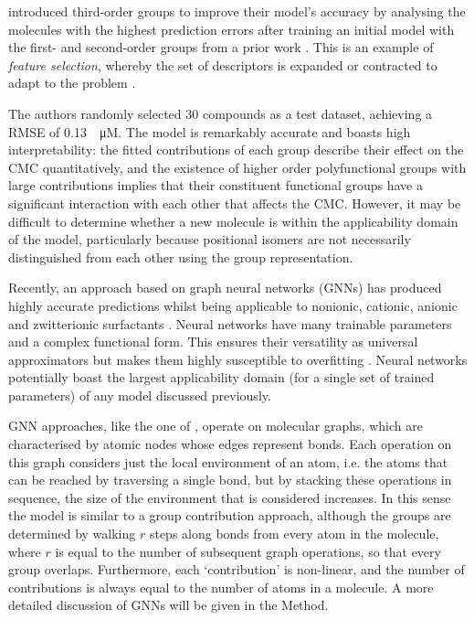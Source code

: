 \citet{matteiModelingCriticalMicelle2013} introduced third-order groups to
improve their model's accuracy by analysing the molecules with the highest
prediction errors after training an initial model with the first- and
second-order groups from a prior work \cite{ganiAutomaticCreationMissing2005}.
This is an example of \emph{feature selection}, whereby the set of descriptors
is expanded or contracted to adapt to the problem
\cite{liFeatureSelectionData2017,guyonIntroductionVariableFeature2003}.

The authors randomly selected 30 compounds as a test dataset, achieving a RMSE
of \SI{0.13}{\log \micro M}. The model is remarkably accurate and boasts high
interpretability: the fitted contributions of each group describe their effect
on the CMC quantitatively, and the existence of higher order polyfunctional
groups with large contributions implies that their constituent functional groups
have a significant interaction with each other that affects the CMC. However, it
may be difficult to determine whether a new molecule is within the applicability
domain of the model, particularly because positional isomers are not necessarily
distinguished from each other using the group representation.

Recently, an approach based on graph neural networks (GNNs) has produced highly
accurate predictions whilst being applicable to nonionic, cationic, anionic and
zwitterionic surfactants \cite{qinPredictingCriticalMicelle2021}. Neural
networks have many trainable parameters and a complex functional form. This
ensures their versatility as universal approximators but makes them highly
susceptible to overfitting \cite{bejaniSystematicReviewOverfitting2021}. Neural
networks potentially boast the largest applicability domain (for a single set of
trained parameters) of any model discussed previously.

GNN approaches, like the one of \citet{qinPredictingCriticalMicelle2021},
operate on molecular graphs, which are characterised by atomic nodes whose edges
represent bonds. Each operation on this graph considers just the local
environment of an atom, i.e. the atoms that can be reached by traversing a
single bond, but by stacking these operations in sequence, the size of the
environment that is considered increases. In this sense the model is similar to
a group contribution approach, although the groups are determined by walking $r$
steps along bonds from every atom in the molecule, where $r$ is equal to the
number of subsequent graph operations, so that every group overlaps.
Furthermore, each `contribution' is non-linear, and the number of contributions
is always equal to the number of atoms in a molecule. A more detailed discussion
of GNNs will be given in the Method.